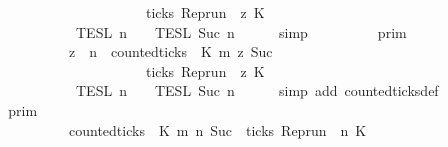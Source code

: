 \begin{isabellebody}
\ \ \ \ \ \ \ \ \ \ \ \ \ \ \ \ \ \ \ \ \ \ \ \ \ \ \ \ {\isasymlongrightarrow}\ ticks\ {\isacharparenleft}{\isacharparenleft}Rep{\isacharunderscore}run\ {\isasymrho}{\isacharparenright}\ z\ K\ {\isacharbraceright}\isanewline
\ \ \ \ \ \ \ \ \ \ \ \ \ \ \ \ {\isasyminter}\ {\isasymlbrakk}{\isasymlbrakk}\ {\isasymPsi}\ {\isasymrbrakk}{\isasymrbrakk}\isactrlsub T\isactrlsub E\isactrlsub S\isactrlsub L\isactrlbsup {\isasymge}\ n\isactrlesup \ {\isasyminter}\ {\isasymlbrakk}{\isasymlbrakk}\ {\isasymPhi}\ {\isasymrbrakk}{\isasymrbrakk}\isactrlsub T\isactrlsub E\isactrlsub S\isactrlsub L\isactrlbsup {\isasymge}\ Suc\ n\isactrlesup {\isacartoucheclose}\isanewline
\ \ \ \ \isamarkupfalse%
\ simp\isanewline
\ \ \isamarkupfalse%
\ \isamarkupfalse%
\ {\isacartoucheopen}{\isachardot}{\isachardot}{\isachardot}\ {\isacharequal}\ {\isasymlbrakk}{\isasymlbrakk}\ {\isasymGamma}\ {\isasymrbrakk}{\isasymrbrakk}\isactrlsub p\isactrlsub r\isactrlsub i\isactrlsub m\ \isanewline
\ \ \ \ \ \ \ \ \ \ \ \ \ \ \ \ {\isasyminter}\ {\isacharbraceleft}{\isasymrho}{\isachardot}\ {\isasymforall}z\ {\isasymge}\ n{\isachardot}\ \ {\isacharparenleft}counted{\isacharunderscore}ticks\ {\isasymrho}\ K\ m\ z\ {\isacharparenleft}Suc\ {}{\isacharparenright}{\isacharparenright}\isanewline
\ \ \ \ \ \ \ \ \ \ \ \ \ \ \ \ \ \ \ \ \ \ \ \ \ \ \ \ {\isasymlongrightarrow}\ ticks\ {\isacharparenleft}{\isacharparenleft}Rep{\isacharunderscore}run\ {\isasymrho}{\isacharparenright}\ z\ K\ {\isacharbraceright}\isanewline
\ \ \ \ \ \ \ \ \ \ \ \ \ \ \ \ {\isasyminter}\ {\isasymlbrakk}{\isasymlbrakk}\ {\isasymPsi}\ {\isasymrbrakk}{\isasymrbrakk}\isactrlsub T\isactrlsub E\isactrlsub S\isactrlsub L\isactrlbsup {\isasymge}\ n\isactrlesup \ {\isasyminter}\ {\isasymlbrakk}{\isasymlbrakk}\ {\isasymPhi}\ {\isasymrbrakk}{\isasymrbrakk}\isactrlsub T\isactrlsub E\isactrlsub S\isactrlsub L\isactrlbsup {\isasymge}\ Suc\ n\isactrlesup {\isacartoucheclose}\isanewline
\ \ \ \ \isamarkupfalse%
\ {\isacharparenleft}simp\ add{\isacharcolon}\ counted{\isacharunderscore}ticks{\isacharunderscore}def{\isacharparenright}\isanewline
\ \ \isamarkupfalse%
\ \isamarkupfalse%
\ {\isacartoucheopen}{\isachardot}{\isachardot}{\isachardot}\ {\isacharequal}\ {\isasymlbrakk}{\isasymlbrakk}\ {\isasymGamma}\ {\isasymrbrakk}{\isasymrbrakk}\isactrlsub p\isactrlsub r\isactrlsub i\isactrlsub m\ \isanewline
\ \ \ \ \ \ \ \ \ \ \ \ \ \ \ \ {\isasyminter}\ {\isacharbraceleft}{\isasymrho}{\isachardot}\ {\isacharparenleft}counted{\isacharunderscore}ticks\ {\isasymrho}\ K\ m\ n\ {\isacharparenleft}Suc\ {}{\isacharparenright}{\isasymlongrightarrow}\ ticks\ {\isacharparenleft}{\isacharparenleft}Rep{\isacharunderscore}run\ {\isasymrho}{\isacharparenright}\ n\ K\isanewline

\end{isabellebody}
